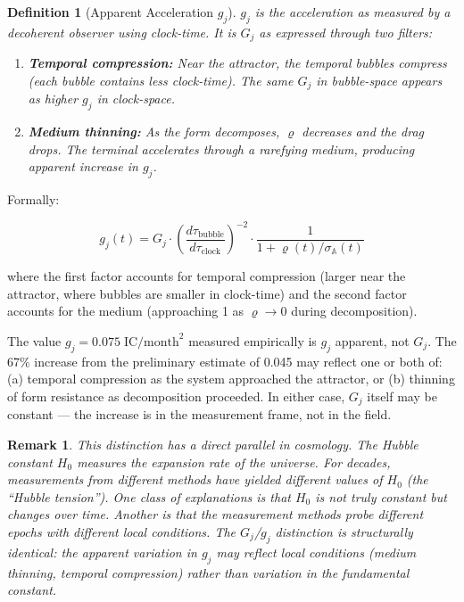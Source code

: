 \documentclass[12pt,a4paper]{article}
\newtheorem{definition}{Definition}[section]
\newtheorem*{remark}{Remark}
\newcommand{\gj}{g_j}
\newcommand{\Gj}{G_j}
\newcommand{\rhof}{\varrho}
\begin{document}
\begin{definition}[Apparent Acceleration $\gj$]\label{def:gj_apparent}
$\gj$ is the acceleration as measured by a decoherent observer using clock-time. It is $\Gj$ as expressed through two filters:

\begin{enumerate}[label=(\alph*)]
    \item \textbf{Temporal compression:} Near the attractor, the temporal bubbles compress (each bubble contains less clock-time). The same $\Gj$ in bubble-space appears as higher $\gj$ in clock-space.
    \item \textbf{Medium thinning:} As the form decomposes, $\rhof$ decreases and the drag drops. The terminal accelerates through a rarefying medium, producing apparent increase in $\gj$.
\end{enumerate}
\end{definition}

Formally:

\begin{equation}\label{eq:gj_apparent}
\gj(t) = \Gj \cdot \left(\frac{d\tau_{\mathrm{bubble}}}{d\tau_{\mathrm{clock}}}\right)^{-2} \cdot \frac{1}{1 + \rhof(t)/\sigma_{\mathbb{A}}(t)}
\end{equation}

\noindent where the first factor accounts for temporal compression (larger near the attractor, where bubbles are smaller in clock-time) and the second factor accounts for the medium (approaching 1 as $\rhof \to 0$ during decomposition).

The value $\gj = 0.075\;\mathrm{IC/month}^2$ measured empirically is $\gj$ apparent, not $\Gj$. The 67\% increase from the preliminary estimate of 0.045 may reflect one or both of: (a) temporal compression as the system approached the attractor, or (b) thinning of form resistance as decomposition proceeded. In either case, $\Gj$ itself may be constant --- the increase is in the measurement frame, not in the field.

\begin{remark}
This distinction has a direct parallel in cosmology. The Hubble constant $H_0$ measures the expansion rate of the universe. For decades, measurements from different methods have yielded different values of $H_0$ (the ``Hubble tension''). One class of explanations is that $H_0$ is not truly constant but changes over time. Another is that the measurement methods probe different epochs with different local conditions. The $\Gj$/$\gj$ distinction is structurally identical: the apparent variation in $\gj$ may reflect local conditions (medium thinning, temporal compression) rather than variation in the fundamental constant.
\end{remark}
\end{document}
